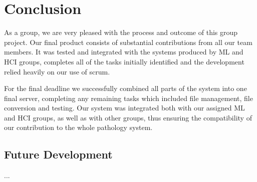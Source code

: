 \section{Conclusion}
As a group, we are very pleased with the process and outcome of this group project. Our final product consists of substantial contributions from all our team members. It was tested and integrated with the systems produced by ML and HCI groups, completes all of the tasks initially identified and the development relied heavily on our use of scrum. 

For the final deadline we successfully combined all parts of the system into one final server, completing any remaining tasks which included file management, file conversion and testing. Our system was integrated both with our assigned ML and HCI groups, as well as with other groups, thus ensuring the compatibility of our contribution to the whole pathology system. 

\subsection{Future Development}
...
